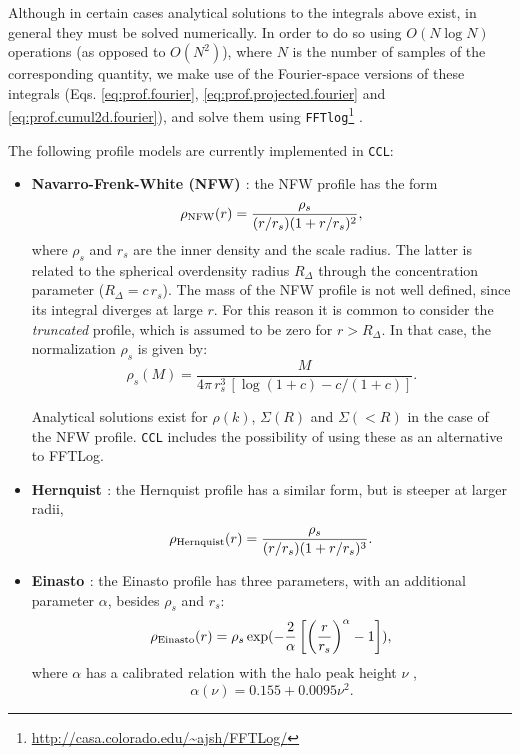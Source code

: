 \documentclass[\docopts]{\docclass}
\newcommand{\ccl}{{\tt CCL}\xspace}
\begin{document}
Although in certain cases analytical solutions to the integrals above exist, in general they must be solved numerically. In order to do so using $O(N\log N)$ operations (as opposed to $O(N^2)$), where $N$ is the number of samples of the corresponding quantity, we make use of the Fourier-space versions of these integrals (Eqs. \ref{eq:prof.fourier}, \ref{eq:prof.projected.fourier} and \ref{eq:prof.cumul2d.fourier}), and solve them using {\tt FFTlog}\footnote{\url{http://casa.colorado.edu/~ajsh/FFTLog/}}
\citep{Hamilton2000,Talman2009}.

The following profile models are currently implemented in \ccl:
\begin{itemize}
  \item {\bf Navarro-Frenk-White (NFW) \citep{Navarro1997}}: the NFW profile has the form
  \begin{equation}
    \rho_{\rm NFW}(r)=\frac{\rho_s}{(r/r_s)(1+r/r_s)^2},
  \end{equation}
  where $\rho_s$ and $r_s$ are the inner density and the scale radius. The latter is related to the spherical overdensity radius $R_\Delta$ through the concentration parameter ($R_\Delta=c\,r_s$). The mass of the NFW profile is not well defined, since its integral diverges at large $r$. For this reason it is common to consider the \emph{truncated} profile, which is assumed to be zero for $r>R_\Delta$. In that case, the normalization $\rho_s$ is given by:
  \begin{equation}
    \rho_s(M) = \frac{M}{4\pi\,r_s^3\,[\log(1+c) - c/(1+c)]}.
  \end{equation}

  Analytical solutions exist for $\rho(k)$, $\Sigma(R)$ and $\Sigma(<R)$ in the case of the NFW profile. \ccl includes the possibility of using these as an alternative to FFTLog.
  \item {\bf Hernquist \citep{Hernquist1990}}: the Hernquist profile has a similar form, but is steeper at larger radii,
  \begin{equation}
    \rho_{\rm Hernquist}(r)=\frac{\rho_s}{(r/r_s)(1+r/r_s)^3}.
  \end{equation}

  \item {\bf Einasto \citep{Einasto1965,Diemer2014}}: the Einasto profile has three parameters, with an additional parameter $\alpha$, besides $\rho_s$ and $r_s$:
  \begin{equation}
    \rho_{\rm Einasto}(r)=\rho_s\exp(-\frac{2}{\alpha}\left [  \left (  \frac{r}{r_s}\right )^\alpha-1\right ]),
  \end{equation}
  where $\alpha$ has a calibrated relation with the halo peak height $\nu$ \citep{Gao2008},
  \begin{equation}
    \alpha(\nu)=0.155+0.0095\nu^2.
  \end{equation}


\end{itemize}
\end{document}
